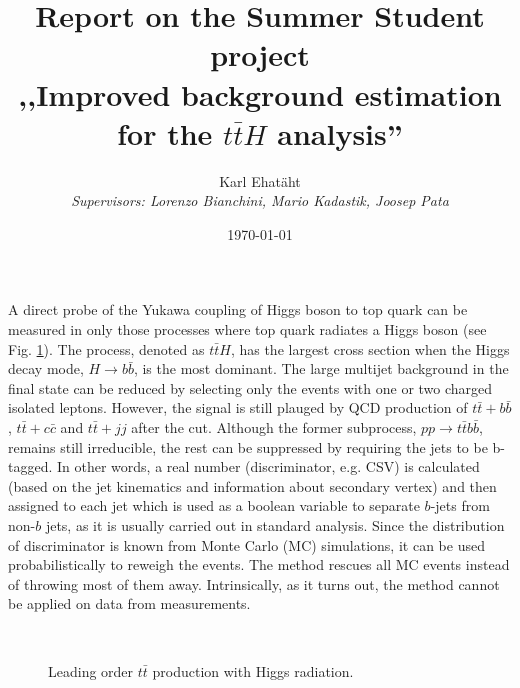 \documentclass[12pt,a4paper]{article}
\title{\TitleFont\textbf{Report on the Summer Student project\\,,Improved background estimation for the $t\bar{t}H$ analysis''}}
\author{Karl Ehatäht\\[0.5em]
\textit{Supervisors: Lorenzo Bianchini, Mario Kadastik, Joosep Pata}}
\date\today
\begin{document}
\maketitle

A direct probe of the Yukawa coupling of Higgs boson to top quark can be measured in only those processes where top quark radiates a Higgs boson (see Fig. \ref{fig:ttH}).
The process, denoted as $t\bar{t}H$, has the largest cross section when the Higgs decay mode, $H \to b\bar{b}$, is the most dominant.
The large multijet background in the final state  can be reduced by selecting only the events with one or two charged isolated leptons.
However, the signal is still plauged by QCD production of $t\bar{t}+b\bar{b}$, $t\bar{t}+c\bar{c}$ and $t\bar{t}+jj$ after the cut.
Although the former subprocess, $pp\to t\bar{t}b\bar{b}$, remains still irreducible, the rest can be suppressed by requiring the jets to be b-tagged.
In other words, a real number (discriminator, e.g. CSV) is calculated (based on the jet kinematics and information about secondary vertex) and then assigned to each jet which is used as a boolean variable to separate $b$-jets from non-$b$ jets, as it is usually carried out in standard analysis.
Since the distribution of discriminator is known from Monte Carlo (MC) simulations, it can be used probabilistically to reweigh the events.
The method rescues all MC events instead of throwing most of them away.
Intrinsically, as it turns out, the method cannot be applied on data from measurements.
\vspace*{1em}
\begin{figure}[H]
	\begin{center}
	~~~~~~~~~~
	\caption{Leading order $t\bar{t}$ production with Higgs radiation.}
	\label{fig:ttH}
	\end{center}
\end{figure}
\end{document}
